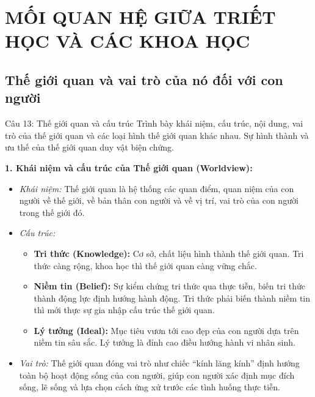 \documentclass[12pt,a4paper]{article}
\begin{document}
{\newpage
\section{MỐI QUAN HỆ GIỮA TRIẾT HỌC VÀ CÁC KHOA HỌC}

\subsection{Thế giới quan và vai trò của nó đối với con người}

\begin{questionbox}{Câu 13: Thế giới quan và cấu trúc}
Trình bày khái niệm, cấu trúc, nội dung, vai trò của thế giới quan và các loại hình thế giới quan khác nhau. Sự hình thành và ưu thế của thế giới quan duy vật biện chứng.
\end{questionbox}

\noindent
\textbf{1. Khái niệm và cấu trúc của Thế giới quan (Worldview):}
\begin{itemize}
    \item \textit{Khái niệm:} Thế giới quan là hệ thống các quan điểm, quan niệm của con người về thế giới, về bản thân con người và về vị trí, vai trò của con người trong thế giới đó.
    \item \textit{Cấu trúc:}
    \begin{itemize}
        \item \textbf{Tri thức (Knowledge):} Cơ sở, chất liệu hình thành thế giới quan. Tri thức càng rộng, khoa học thì thế giới quan càng vững chắc.
        \item \textbf{Niềm tin (Belief):} Sự kiểm chứng tri thức qua thực tiễn, biến tri thức thành động lực định hướng hành động. Tri thức phải biến thành niềm tin thì mới thực sự gia nhập cấu trúc thế giới quan.
        \item \textbf{Lý tưởng (Ideal):} Mục tiêu vươn tới cao đẹp của con người dựa trên niềm tin sâu sắc. Lý tưởng là đỉnh cao điều hướng hành vi nhân sinh.
    \end{itemize}
    \item \textit{Vai trò:} Thế giới quan đóng vai trò như chiếc ``kính lăng kính'' định hướng toàn bộ hoạt động sống của con người, giúp con người xác định mục đích sống, lẽ sống và lựa chọn cách ứng xử trước các tình huống thực tiễn.
\end{itemize}

}
\end{document}

